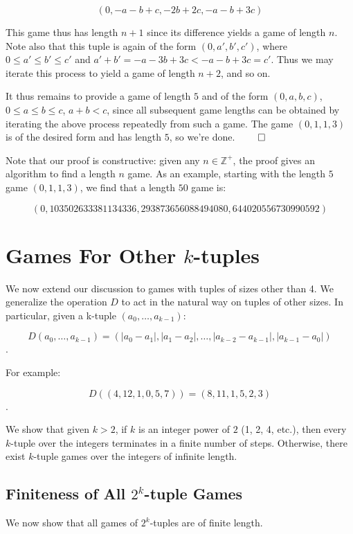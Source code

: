 \documentclass[12pt]{amsart}
\newcommand{\diff}{D}
\newcommand{\zp}{\mathbb{Z}^+}
\begin{document}
$$(0, -a - b + c, -2b + 2c, -a - b + 3c)$$

This game thus has length $n + 1$ since its difference yields a game of length $n$. Note also that this tuple is again of the form $(0, a', b', c')$, where $0\leq a'\leq b'\leq c'$ and $a' + b' = -a - 3b + 3c < -a - b + 3c = c'$. Thus we may iterate this process to yield a game of length $n + 2$, and so on.

It thus remains to provide a game of length $5$ and of the form $(0, a, b, c)$, $0\leq a\leq b\leq c$, $a + b < c$, since all subsequent game lengths can be obtained by iterating the above process repeatedly from such a game. The game $(0, 1, 1, 3)$ is of the desired form and has length $5$, so we're done. $\qed$

Note that our proof is constructive: given any $n\in \zp$, the proof gives an algorithm to find a length $n$ game. As an example, starting with the length $5$ game $(0, 1, 1, 3)$, we find that a length $50$ game is:

$$(0, 103502633381134336, 293873656088494080, 644020556730990592)$$

\section{Games For Other $k$-tuples\label{sec:othertuples}}

We now extend our discussion to games with tuples of sizes other than 4. We generalize the operation $\diff$ to act in the natural way on tuples of other sizes. In particular, given a k-tuple $(a_0, \ldots, a_{k-1})$:

$$\diff(a_0, \ldots, a_{k-1}) = (|a_0 - a_1|, |a_1 - a_2|, \ldots, |a_{k-2} - a_{k-1}|, |a_{k-1} - a_0|)$$.

For example:

$$\diff((4, 12, 1, 0, 5, 7)) = (8, 11, 1, 5, 2, 3)$$.

We show that given $k > 2$, if $k$ is an integer power of $2$ (1, 2, 4, etc.), then every $k$-tuple over the integers terminates in a finite number of steps. Otherwise, there exist $k$-tuple games over the integers of infinite length.

\subsection{Finiteness of All $2^k$-tuple Games}

We now show that all games of $2^k$-tuples are of finite length.
\end{document}
